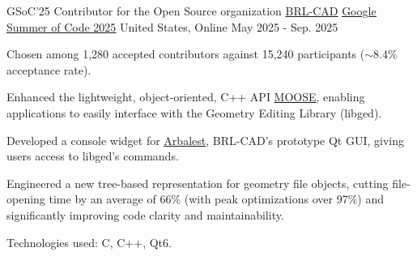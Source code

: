 

\begin{cventries}

  \cventry
    {GSoC'25 Contributor for the Open Source organization \underline{\href{https://github.com/BRL-CAD/brlcad}{BRL-CAD}}} %
    {\underline{\href{https://summerofcode.withgoogle.com/programs/2025/projects/25f08iuM}{Google Summer of Code 2025}}} %
    {United States, Online} %
    {May 2025 - Sep. 2025} %
    {
      \begin{cvitems} %
        \item {Chosen among 1,280 accepted contributors against 15,240 participants ($\sim$8.4\% acceptance rate).}
        \item {Enhanced the lightweight, object-oriented, C++ API \underline{\href{https://github.com/BRL-CAD/MOOSE}{MOOSE}}, enabling applications to easily interface with the Geometry Editing Library (libged).}
        \item {Developed a console widget for \underline{\href{https://github.com/BRL-CAD/arbalest}{Arbalest}}, BRL-CAD's prototype Qt GUI, giving users access to libged's commands.}
        \item {Engineered a new tree-based representation for geometry file objects, cutting file-opening time by an average of 66\% (with peak optimizations over 97\%) and significantly improving code clarity and maintainability.}
        \item {Technologies used: C, C++, Qt6.}
      \end{cvitems}
    }

\end{cventries}
